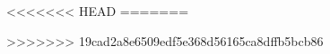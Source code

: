 
 \newpage

 \newpage

 \newpage

\newpage

<<<<<<< HEAD
=======


>>>>>>> 19cad2a8e6509edf5e368d56165ca8dffb5bcb86

